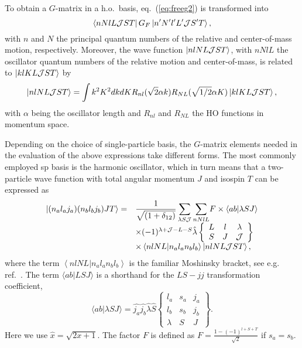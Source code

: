 To obtain a $G$-matrix in a h.o.~basis, eq.\ (\ref{eq:freeg2})
is transformed into
\begin{equation}
     \left\langle nNlL{\cal J}ST \right|G_F\left| n'N'l'L'{\cal J}S'T \right\rangle,
\end{equation}
with $n$ and $N$ the principal quantum numbers of the relative and
center-of-mass motion, respectively.
Moreover, the wave function $\left| nlNL{\cal J}ST \right\rangle$, with $nNlL$ the
oscillator quantum numbers of the relative motion and center-of-mass,
is related
to $\left| klKL{\cal J}ST \right\rangle$ by \cite{bon89}
\begin{equation}
   \left| nlNL{\cal J}ST \right\rangle= \int k^{2}K^{2}dkdKR_{nl}(\sqrt{2}\alpha k)
R_{NL}(\sqrt{1/2}\alpha K)
\left| klKL{\cal J}ST \right\rangle,
\end{equation}
with $\alpha$ being the oscillator length and $R_{nl}$ and $R_{NL}$ the HO
functions in momentum space.

Depending on the choice of single-particle basis, the $G$-matrix elements
needed in the evaluation of the above expressions take different forms.
The most commonly employed sp basis is the harmonic oscillator, which
in turn means that
a two-particle wave function with total angular momentum $J$
and isospin $T$
can be expressed as \cite{law80}
\begin{equation}
\begin{array}{ll}
\left| (n_{a}l_{a}j_{a})(n_{b}l_{b}j_{b})JT \right\rangle=&
{\displaystyle
\frac{1}{\sqrt{(1+\delta_{12})}}
\sum_{\lambda S{\cal J}}\sum_{nNlL}}
F\times \langle ab|\lambda SJ \rangle\\
&\times (-1)^{\lambda +{\cal J}-L-S}\hat{\lambda}
\left\{\begin{array}{ccc}L&l&\lambda\\S&J&{\cal J}
\end{array}\right\}\\
&\times \left\langle nlNL| n_al_an_bl_b\right\rangle
\left| nlNL{\cal J}ST \right\rangle,\end{array}\label{eq:hoho}
\end{equation}
where the term
$\left\langle nlNL| n_al_an_bl_b\right\rangle$
is the familiar Moshinsky bracket, see e.g. ref.\ \cite{law80}.
The term $\langle ab|LSJ \rangle $ is a shorthand
for the $LS-jj$ transformation coefficient,
\begin{equation}
     \langle ab|\lambda SJ \rangle = \hat{j_{a}}\hat{j_{b}}
     \hat{\lambda}\hat{S}
     \left\{
    \begin{array}{ccc}
       l_{a}&s_a&j_{a}\\
       l_{b}&s_b&j_{b}\\
       \lambda    &S          &J
    \end{array}
    \right\}.\label{eq:lstrans}
\end{equation}
Here
we use $\hat{x} = \sqrt{2x +1}$.
The factor $F$ is defined as $F=\frac{1-(-1)^{l+S+T}}{\sqrt{2}}$ if
$s_a = s_b$.

